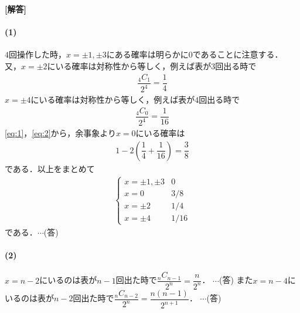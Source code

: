 \documentclass[../../main.tex]{subfiles}
\begin{document}
\begin{oframed}
  
\end{oframed}

{\bf [解答]}

\paragraph{(1)}

$4$回操作した時，$x=\pm1,\pm3$にある確率は明らかに$0$であることに注意する．
又，$x=\pm2$にいる確率は対称性から等しく，例えば表が$3$回出る時で
\begin{align}
  \dfrac{{}_4C_1}{2^4}=\dfrac{1}{4}\label{eq:1}
\end{align}
$x=\pm4$にいる確率は対称性から等しく，例えば表が$4$回出る時で
\begin{align}
  \dfrac{{}_4C_0}{2^4}=\dfrac{1}{16}\label{eq:2}
\end{align}
\cref{eq:1}，\cref{eq:2}から，余事象より$x=0$にいる確率は
\begin{align}
  1-2\left(\dfrac{1}{4}+\dfrac{1}{16}\right)=\dfrac{3}{8}
\end{align}
である．以上をまとめて
\begin{align}
  \begin{cases}
    x=\pm1,\pm3 & 0     \\
    x=0                & 3/8   \\
    x=\pm2          & 1/4   \\
    x=\pm4          & 1/16
  \end{cases}
\end{align}
である．$\cdots$(答)

\paragraph{(2)}

$x=n-2$にいるのは表が$n-1$回出た時で$\dfrac{{}_nC_{n-1}}{2^n}=\dfrac{n}{2^n}$．
$\cdots$(答)
また$x=n-4$にいるのは表が$n-2$回出た時で$\dfrac{{}_nC_{n-2}}{2^n}=\dfrac{n(n-1)}{2^{n+1}}$．
$\cdots$(答)
\newpage
\end{document}
